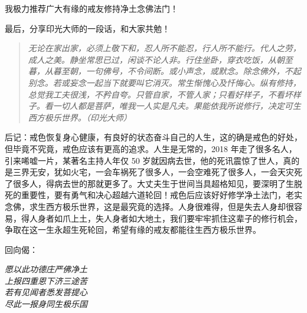 我极力推荐广大有缘的戒友修持净土念佛法门！

最后，分享印光大师的一段话，和大家共勉！

\begin{quote}\it
    无论在家出家，必须上敬下和，忍人所不能忍，行人所不能行。代人之劳，成人之美。静坐常思已过，闲谈不论人非。行住坐卧，穿衣吃饭，从朝至暮，从暮至朝，一句佛号，不令间断。或小声念，或默念。除念佛外，不起别念。若或妄念一起当下就要叫它消灭。常生惭愧心及忏悔心。纵有修持，总觉我工夫很浅，不矜自夸。只管自家，不管人家；只看好样子，不看坏样子。看一切人都是菩萨，唯我一人实是凡夫。果能依我所说修行，决定可生西方极乐世界。（印光大师）
\end{quote}

后记：戒色恢复身心健康，有良好的状态奋斗自己的人生，这的确是戒色的好处，但毕竟不究竟，戒色应该有更高的追求。人生是无常的，2018 年走了很多名人，引来唏嘘一片，某著名主持人年仅 50 岁就因病去世，他的死讯震惊了世人，真的是三界无安，犹如火宅，一会车祸死了很多人，一会空难死了很多人，一会天灾死了很多人，得病去世的那就更多了。大丈夫生于世间当具超格知见，要深明了生脱死的重要性，要有勇气和决心超越六道轮回！戒色后应该好好修学净土法门，老实念佛，求生西方极乐世界，这是最究竟的选择。人身很难得，但是失去人身却很容易，得人身者如爪上土，失人身者如大地土，我们要牢牢抓住这辈子的修行机会，争取在这一生永超生死轮回，希望有缘的戒友都能往生西方极乐世界。

回向偈：

\begin{center}\it
    愿以此功德\quad 庄严佛净土 \\ 上报四重恩\quad 下济三途苦 \\ 若有见闻者\quad 悉发菩提心 \\ 尽此一报身\quad 同生极乐国
\end{center}
